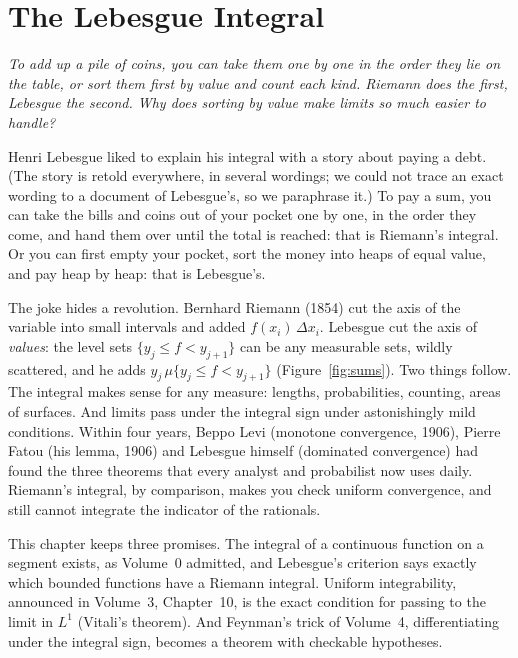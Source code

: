 \chapter{The Lebesgue Integral}

\begin{center}\itshape
To add up a pile of coins, you can take them one by one in the order they lie on the table, or sort them first by value
and count each kind. Riemann does the first, Lebesgue the second. Why does sorting by value make limits so much
easier to handle?
\end{center}


Henri Lebesgue liked to explain his integral with a story about paying a debt. (The story is retold everywhere, in several wordings;
we could not trace an exact wording to a document of Lebesgue's, so we paraphrase it.) To pay a sum, you can take the bills and coins out of your
pocket one by one, in the order they come, and hand them over until the total is reached: that is Riemann's integral. Or you can first
empty your pocket, sort the money into heaps of equal value, and pay heap by heap: that is Lebesgue's.

The joke hides a revolution. Bernhard Riemann (1854) cut the axis of the variable into small intervals and added $f(x_i)\,\Delta x_i$.
Lebesgue cut the axis of \emph{values}: the level sets $\{y_j\le f<y_{j+1}\}$ can be any measurable sets, wildly scattered, and he
adds $y_j\,\mu\{y_j\le f<y_{j+1}\}$ (Figure~\ref{fig:sums}). Two things follow. The integral makes sense for any measure: lengths,
probabilities, counting, areas of surfaces. And limits pass under the integral sign under astonishingly mild conditions. Within
four years, Beppo Levi (monotone convergence, 1906), Pierre Fatou (his lemma, 1906) and Lebesgue himself (dominated convergence)
had found the three theorems that every analyst and probabilist now uses daily. Riemann's integral, by comparison, makes you
check uniform convergence, and still cannot integrate the indicator of the rationals.

This chapter keeps three promises. The integral of a continuous function on a segment exists, as Volume~0 admitted, and Lebesgue's
criterion says exactly which bounded functions have a Riemann integral. Uniform integrability, announced in Volume~3,
Chapter~10, is the exact condition for passing to the limit in $L^1$ (Vitali's theorem). And Feynman's trick of Volume~4,
differentiating under the integral sign, becomes a theorem with checkable hypotheses.

